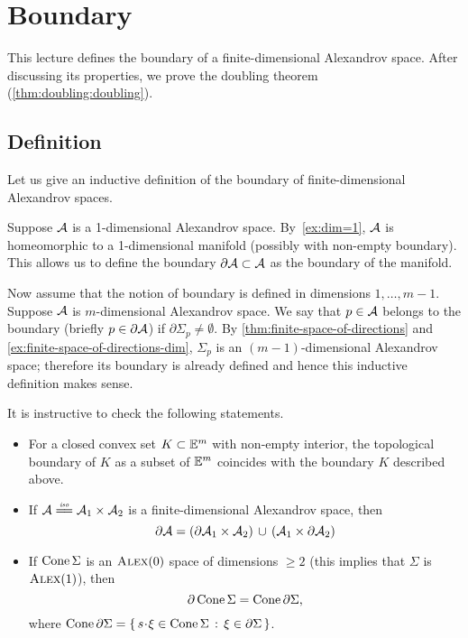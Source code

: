 \chapter{Boundary}\label{chap:bry}

This lecture defines the boundary of a finite-dimensional Alexandrov space.
After discussing its properties, we prove the doubling theorem (\ref{thm:doubling:doubling}).

\section{Definition}

Let us give an inductive definition of the boundary of finite-dimensional Alexandrov spaces.

Suppose $\mathcal{A}$ is a 1-dimensional Alexandrov space.
By~\ref{ex:dim=1},
$\mathcal{A}$ is homeomorphic to a 1-dimensional manifold (possibly with non-empty boundary).
This  allows us to define the boundary $\partial\mathcal{A}\subset \mathcal{A}$ as the boundary of the manifold.

Now assume that the notion of boundary is defined in dimensions $1,\dots,m-1$.
Suppose  $\mathcal{A}$ is $m$-dimensional Alexandrov space.
We say that $p\in \mathcal{A}$ belongs to the boundary (briefly $p\in \partial \mathcal{A}$) if 
$\partial\Sigma_p\ne\emptyset$.
By \ref{thm:finite-space-of-directions} and \ref{ex:finite-space-of-directions-dim}, $\Sigma_p$ is an $(m-1)$-dimensional Alexandrov space;
therefore its boundary is already defined and hence this inductive definition makes sense.

It is instructive to check the following statements.
\begin{itemize}
\item For a closed convex set $K\subset \mathbb{E}^m$ with non-empty interior, the topological boundary of $K$ as a subset of $\mathbb{E}^m$ coincides with the boundary $K$ described above.
\item If $\spc{A}\iso\spc{A}_1\times\spc{A}_2$ is a finite-dimensional Alexandrov space,
then
\[\partial \mathcal{A}=(\partial\mathcal{A}_1\times\mathcal{A}_2)\,\cup\,(\mathcal{A}_1\times\partial\mathcal{A}_2)\]
\item If $\mathop{\rm Cone}\nolimits\Sigma$ is an $\textsc{Alex}(0)$ space of dimensions $\ge 2$ (this implies that $\Sigma$ is  $\textsc{Alex}(1)$), then
\[\partial \mathop{\rm Cone}\nolimits\Sigma=\mathop{\rm Cone}\nolimits\partial\Sigma,\]
where $\Cone\partial\Sigma=\set{s\cdot \xi\in\Cone\Sigma }{\xi\in \partial\Sigma}$.
\end{itemize}


